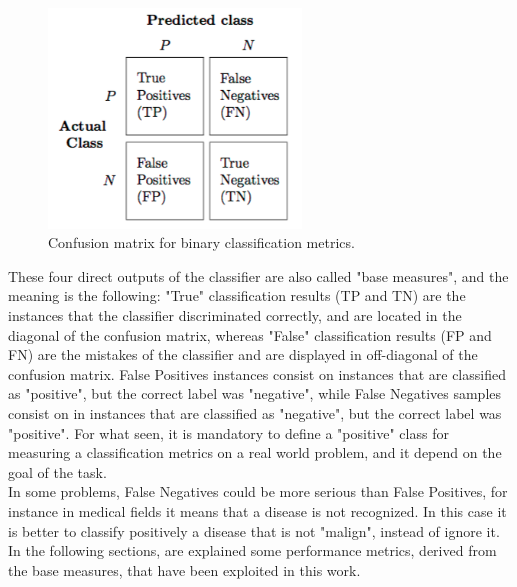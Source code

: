 \begin{figure}[ht]
	\centering
	\includegraphics[width=0.6\textwidth]{figures/confusion_matrix.png}
	\caption{Confusion matrix for binary classification metrics.}
	\label{fig:confusion-matrix}
\end{figure}

These four direct outputs of the classifier are also called "base measures", and the meaning is the following: "True" classification results (TP and TN) are the instances that the classifier discriminated correctly, and are located in the diagonal of the confusion matrix, whereas "False" classification results (FP and FN) are the mistakes of the classifier and are displayed in off-diagonal of the confusion matrix. False Positives instances consist on instances that are classified as "positive", but the correct label was "negative", while False Negatives samples consist on in instances that are classified as "negative", but the correct label was "positive". For what seen, it is mandatory to define a "positive" class for measuring a classification metrics on a real world problem, and it depend on the goal of the task.\\
In some problems, False Negatives could be more serious than False Positives, for instance in medical fields it means that a disease is not recognized. In this case it is better to classify positively a disease that is not "malign", instead of ignore it. \\
In the following sections, are explained some performance metrics, derived from the base measures, that have been exploited in this work.

